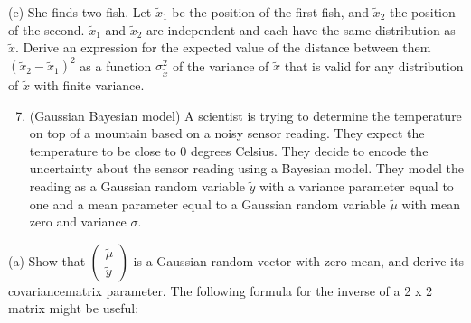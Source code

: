 \documentclass[10pt]{article}
\begin{document}
(e) She finds two fish. Let $\tilde{x}_{1}$ be the position of the first fish, and $\tilde{x}_{2}$ the position of the second. $\tilde{x}_{1}$ and $\tilde{x}_{2}$ are independent and each have the same distribution as $\tilde{x}$. Derive an expression for the expected value of the distance between them $\left(\tilde{x}_{2}-\tilde{x}_{1}\right)^{2}$ as a function $\sigma_{\tilde{x}}^{2}$ of the variance of $\tilde{x}$ that is valid for any distribution of $\tilde{x}$ with finite variance.

\begin{enumerate}
  \setcounter{enumi}{6}
  \item (Gaussian Bayesian model) A scientist is trying to determine the temperature on top of a mountain based on a noisy sensor reading. They expect the temperature to be close to 0 degrees Celsius. They decide to encode the uncertainty about the sensor reading using a Bayesian model. They model the reading as a Gaussian random variable $\tilde{y}$ with a variance parameter equal to one and a mean parameter equal to a Gaussian random variable $\tilde{\mu}$ with mean zero and variance $\sigma$.
\end{enumerate}

(a) Show that $\left(\begin{array}{c}\tilde{\mu} \\ \tilde{y}\end{array}\right)$ is a Gaussian random vector with zero mean, and derive its covariancematrix parameter. The following formula for the inverse of a 2 x 2 matrix might be useful:
\end{document}
